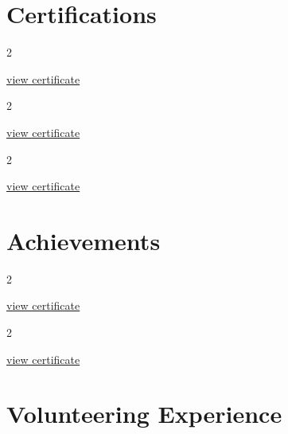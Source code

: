 \documentclass[10pt, letterpaper]{article}
\newenvironment{twocolentry}[2][]{
    \onecolentry
    \def\secondColumn{#2}
    \setcolumnwidth{\fill, 4.5 cm}
    \begin{paracol}{2}
}{
    \switchcolumn \raggedleft \secondColumn
    \end{paracol}
    \endonecolentry
} %
\begin{document}
    \section{Certifications}

        \begin{twocolentry}{
            \href{https://www.hackerrank.com/certificates/79bbe607d55e}{view certificate}
        }
        \end{twocolentry}
        \vspace{0.15 cm}

        \begin{twocolentry}{
            \href{https://alison.com/verify/f18ae5457c}{view certificate}
        }
        \end{twocolentry}
        \vspace{0.15 cm}

        \begin{twocolentry}{
            \href{https://drive.google.com/drive/folders/1I_y8o0SWgzS2IWM4toWT0XBUt9Rg1dfh}{view certificate}
        }
        \end{twocolentry}

    \section{Achievements}

        \begin{twocolentry}{
            \href{https://www.hackerrank.com/profile/jashva25}{view certificate}
        }
        \end{twocolentry}
        \vspace{0.15 cm}

        \begin{twocolentry}{
            \href{https://leetcode.com/u/Balakirushnan_Jashvanth/}{view certificate}
        }
        \end{twocolentry}

    \section{Volunteering Experience}
\end{document}
